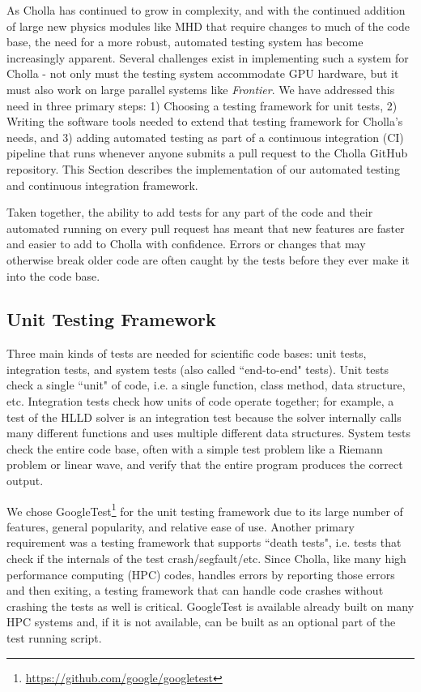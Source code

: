 \documentclass[modern, linenumbers]{aastex631}
\begin{document}
As Cholla has continued to grow in complexity, and with the continued addition of large new physics modules like MHD that require changes to much of the code base, the need for a more robust, automated testing system has become increasingly apparent. Several challenges exist in implementing such a system for Cholla - not only must the testing system accommodate GPU hardware, but it must also work on large parallel systems like \textit{Frontier}. We have addressed this need in three primary steps: 1) Choosing a testing framework for unit tests, 2) Writing the software tools needed to extend that testing framework for Cholla's needs, and 3) adding automated testing as part of a continuous integration (CI) pipeline that runs whenever anyone submits a pull request to the Cholla GitHub repository. This Section describes the implementation of our automated testing and continuous integration framework.

Taken together, the ability to add tests for any part of the code and their automated running on every pull request has meant that new features are faster and easier to add to Cholla with confidence. Errors or changes that may otherwise break older code are often caught by the tests before they ever make it into the code base.

\subsection{Unit Testing Framework}
\label{sec:testing-framework}

Three main kinds of tests are needed for scientific code bases: unit tests, integration tests, and system tests (also called ``end-to-end" tests). Unit tests check a single ``unit" of code, i.e. a single function, class method, data structure, etc. Integration tests check how units of code operate together; for example, a test of the HLLD solver is an integration test because the solver internally calls many different functions and uses multiple different data structures. System tests check the entire code base, often with a simple test problem like a Riemann problem or linear wave, and verify that the entire program produces the correct output.

We chose GoogleTest\footnote{\url{https://github.com/google/googletest}} for the unit testing framework due to its large number of features, general popularity, and relative ease of use. Another primary requirement was a testing framework that supports ``death tests", i.e. tests that check if the internals of the test crash/segfault/etc. Since Cholla, like many high performance computing (HPC) codes, handles errors by reporting those errors and then exiting, a testing framework that can handle code crashes without crashing the tests as well is critical. GoogleTest is available already built on many HPC systems and, if it is not available, can be built as an optional part of the test running script.
\end{document}

